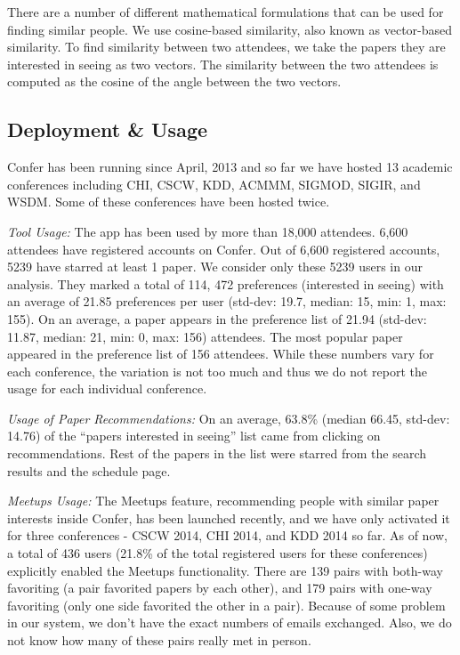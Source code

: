 \documentclass{sigchi}
\begin{document}
There are a number of different mathematical formulations that can be used for finding similar people. We use cosine-based similarity, also known as vector-based similarity. To find similarity between two attendees, we take the papers they are interested in seeing as two vectors. The similarity between the two attendees is computed as the cosine of the angle between the two vectors. 

\subsection{Deployment \& Usage}
Confer has been running since April, 2013 and so far we have hosted 13 academic conferences including CHI, CSCW, KDD, ACMMM, SIGMOD, SIGIR, and WSDM. Some of these conferences have been hosted twice.

\emph{Tool Usage:} The app has been used by more than 18,000 attendees. 6,600 attendees have registered accounts on Confer. Out of 6,600 registered accounts, 5239 have starred at least 1 paper. We consider only these 5239 users in our analysis. They marked a total of 114, 472 preferences (interested in seeing) with an average of 21.85 preferences per user (std-dev: 19.7, median: 15, min: 1, max: 155). On an average, a paper appears in the preference list of 21.94 (std-dev: 11.87, median: 21, min: 0, max: 156) attendees. The most popular paper appeared in the preference list of 156 attendees. While these numbers vary for each conference, the variation is not too much and thus we do not report the usage for each individual conference.

\emph{Usage of Paper Recommendations:} On an average, 63.8\% (median 66.45, std-dev: 14.76) of the ``papers interested in seeing'' list came from clicking on recommendations. Rest of the papers in the list were starred from the search results and the schedule page.

\emph{Meetups Usage:} The Meetups feature, recommending people with similar paper interests inside Confer, has been launched recently, and we have only activated it for three conferences - CSCW 2014, CHI 2014, and KDD 2014 so far. As of now,  a total of 436 users (21.8\% of the total registered users for these conferences) explicitly enabled the Meetups functionality. There are 139 pairs with both-way favoriting (a pair favorited papers by each other), and 179 pairs with one-way favoriting (only one side favorited the other in a pair). Because of some problem in our system, we don't have the exact numbers of emails exchanged. Also, we do not know how many of these pairs really met in person.
\end{document}
